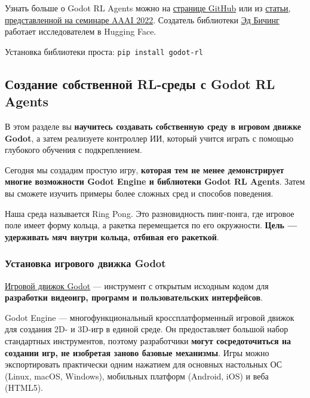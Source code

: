 \documentclass[11pt,a4paper]{article}
\begin{document}
Узнать больше о Godot RL Agents можно на \href{https://github.com/edbeeching/godot_rl_agents}{странице GitHub} или из \href{https://arxiv.org/abs/2112.03636}{статьи, представленной на семинаре AAAI 2022}. Создатель библиотеки \href{https://edbeeching.github.io/}{Эд Бичинг} работает исследователем в Hugging Face.

Установка библиотеки проста: \texttt{pip\ install\ godot-rl}

\subsection{Создание собственной RL-среды с Godot RL Agents}\label{create-a-custom-rl-environment-with-godot-rl-agents}

В этом разделе вы \textbf{научитесь создавать собственную среду в игровом движке Godot}, а затем реализуете контроллер ИИ, который учится играть с помощью глубокого обучения с подкреплением.

Сегодня мы создадим простую игру, \textbf{которая тем не менее демонстрирует многие возможности Godot Engine и библиотеки Godot RL Agents}. Затем вы сможете изучить примеры более сложных сред и способов поведения.

Наша среда называется Ring Pong. Это разновидность пинг-понга, где игровое поле имеет форму кольца, а ракетка перемещается по его окружности. \textbf{Цель --- удерживать мяч внутри кольца, отбивая его ракеткой}.


\subsubsection{Установка игрового движка Godot}\label{installing-the-godot-game-engine}

\href{https://godotengine.org/}{Игровой движок Godot} --- инструмент с открытым исходным кодом для \textbf{разработки видеоигр, программ и пользовательских интерфейсов}.

Godot Engine --- многофункциональный кроссплатформенный игровой движок для создания 2D- и 3D-игр в единой среде. Он предоставляет большой набор стандартных инструментов, поэтому разработчики \textbf{могут сосредоточиться на создании игр, не изобретая заново базовые механизмы}. Игры можно экспортировать практически одним нажатием для основных настольных ОС (Linux, macOS, Windows), мобильных платформ (Android, iOS) и веба (HTML5).
\end{document}
